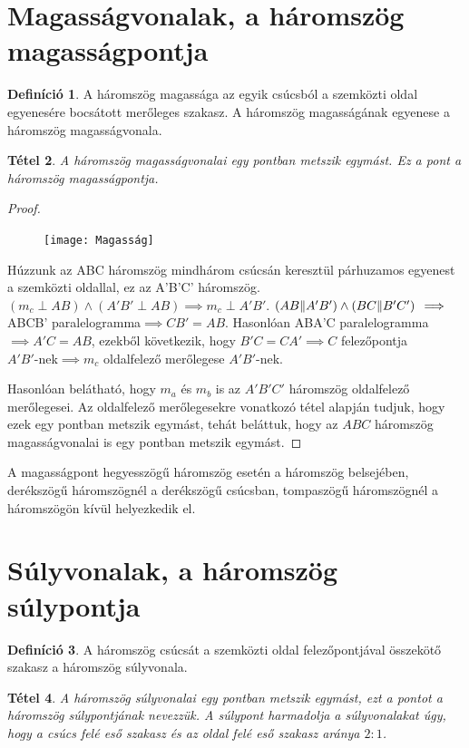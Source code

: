 \documentclass[twoside,12pt]{report}
\newtheorem{theorem}{Tétel}[section]
\theoremstyle{definition}
\newtheorem{definition}[theorem]{Definíció}
\begin{document}
\section{Magasságvonalak, a háromszög magasságpontja}
	\begin{definition}
		A háromszög magassága az egyik csúcsból a szemközti oldal egyenesére bocsátott merőleges szakasz. A háromszög magasságának egyenese a háromszög magasságvonala.
	\end{definition}
	\begin{theorem}
		A háromszög magasságvonalai egy pontban metszik egymást. Ez a pont a háromszög magasságpontja.
	\end{theorem}
	\begin{proof}
		\begin{figure}[H]
			\centering
			\texttt{[image: Magasság]}
		\end{figure}
		Húzzunk az ABC háromszög mindhárom csúcsán keresztül párhuzamos egyenest a szemközti oldallal, ez az A'B'C' háromszög.\\
		$\left(m_c\perp AB\right)\wedge\left(A'B'\perp AB\right)\implies m_c\perp A'B'$. $\left(AB\|A'B'\right)\wedge\left(BC\|B'C'\right)\\
		\implies$ ABCB' paralelogramma$\implies CB'=AB$. Hasonlóan ABA'C paralelogramma $\implies A'C=AB$, ezekből következik, hogy $B'C=CA'\implies C$ felezőpontja\\
		$A'B'$-nek$\implies m_c$ oldalfelező merőlegese $A'B'$-nek. 
		
		Hasonlóan belátható, hogy $m_a$ és $m_b$ is az $A'B'C'$ háromszög oldalfelező merőlegesei. Az oldalfelező merőlegesekre vonatkozó tétel alapján tudjuk, hogy ezek egy pontban metszik
		egymást, tehát beláttuk, hogy az $ABC$ háromszög magasságvonalai is egy pontban metszik
		egymást.
	\end{proof}
	A magasságpont hegyesszögű háromszög esetén a háromszög belsejében, derékszögű háromszögnél
	a derékszögű csúcsban, tompaszögű háromszögnél a háromszögön kívül helyezkedik el.
\section{Súlyvonalak, a háromszög súlypontja}
	\begin{definition}
		A háromszög csúcsát a szemközti oldal felezőpontjával összekötő szakasz a háromszög
		súlyvonala.
	\end{definition}
	\begin{theorem}
		A háromszög súlyvonalai egy pontban metszik egymást, ezt a pontot a háromszög súlypontjának
		nevezzük. A súlypont harmadolja a súlyvonalakat úgy, hogy a csúcs felé eső szakasz és az oldal felé eső szakasz aránya $2:1$.
	\end{theorem}
\end{document}
